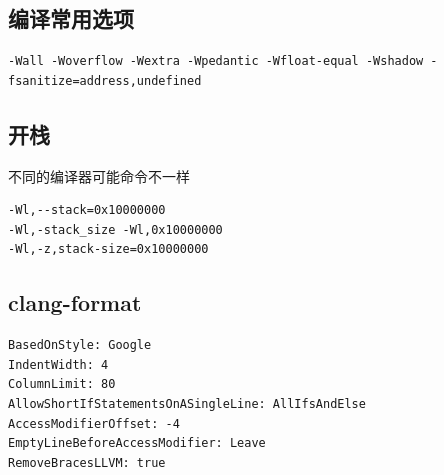 \documentclass[UTF8]{ctexart}
\begin{document}
\begin{sloppypar}
\subsection{编译常用选项}

\begin{lstlisting}[style=cpp]
-Wall -Woverflow -Wextra -Wpedantic -Wfloat-equal -Wshadow -fsanitize=address,undefined
\end{lstlisting}

\subsection{开栈}

不同的编译器可能命令不一样

\begin{lstlisting}[style=cpp]
-Wl,--stack=0x10000000
-Wl,-stack_size -Wl,0x10000000
-Wl,-z,stack-size=0x10000000
\end{lstlisting}

\subsection{clang-format}

\begin{lstlisting}[style=cpp]
BasedOnStyle: Google
IndentWidth: 4
ColumnLimit: 80
AllowShortIfStatementsOnASingleLine: AllIfsAndElse
AccessModifierOffset: -4
EmptyLineBeforeAccessModifier: Leave
RemoveBracesLLVM: true
\end{lstlisting}

\end{sloppypar}
\end{document}
